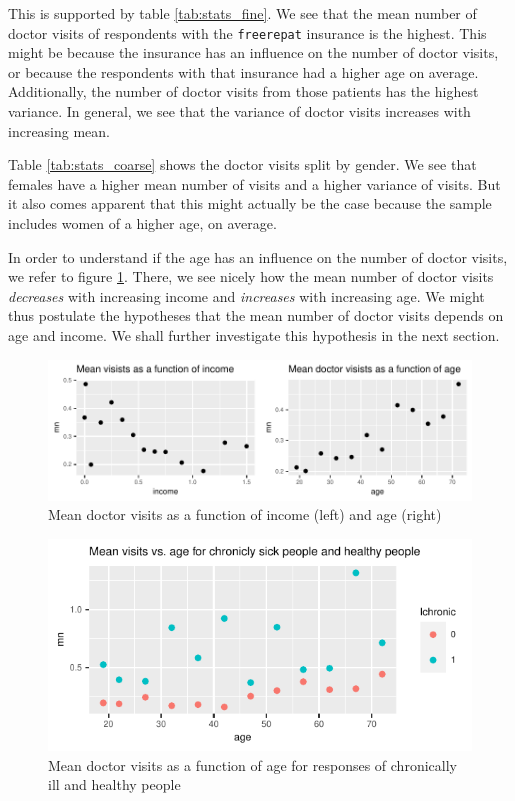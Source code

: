 \documentclass[a4paper,11pt]{article}
\begin{document}
This is supported by table \ref{tab:stats_fine}. We see that the mean number of doctor visits of respondents with the \texttt{freerepat} insurance is the highest. This might be because the insurance has an influence on the number of doctor visits, or because the respondents with that insurance had a higher age on average. Additionally, the number of doctor visits from those patients has the highest variance. In general, we see that the variance of doctor visits increases with increasing mean.



Table \ref{tab:stats_coarse} shows the doctor visits split by gender. We see that females have a higher mean number of visits and a higher variance of visits. But it also comes apparent that this might actually be the case because the sample includes women of a higher age, on average.



In order to understand if the age has an influence on the number of doctor visits, we refer to figure \ref{fig:scatter_income_and_age}. There, we see nicely how the mean number of doctor visits \emph{decreases} with increasing income and \emph{increases} with increasing age. We might thus postulate the hypotheses that the mean number of doctor visits depends on age and income. We shall further investigate this hypothesis in the next section.

\begin{figure}[h]
	\centering
\includegraphics{../plots/mean_vs_income_and_age.pdf}
	\caption{Mean doctor visits as a function of income (left) and age (right)}
		\label{fig:scatter_income_and_age}
\end{figure}

\begin{figure}[h]
	\centering
\includegraphics{../plots/mean_vs_age_and_chronic.pdf}

\caption{Mean doctor visits as a function of age for responses of chronically ill and healthy people}
\label{fig:scatter_age_and_chronic}
\end{figure}
\end{document}
